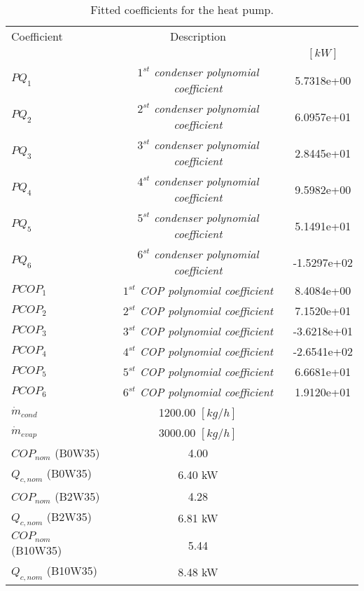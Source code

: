\documentclass[english]{SPFShortReport}
\author{Dani Carbonell}
\begin{document}
\begin{table}[!ht]
\begin{small}
\caption{Fitted coefficients for the heat pump.}
\begin{center}
\resizebox{12cm}{!} 
{
\begin{tabular}{l | c c } 
\hline
\hline
Coefficient &Description & \\ 
 & &$[kW]$\\ 
\hline
$PQ_{1}$ & \emph{$1^{st}$ condenser polynomial coefficient}  & 5.7318e+00    \\ 
$PQ_{2}$ & \emph{$2^{st}$ condenser polynomial coefficient}  & 6.0957e+01    \\ 
$PQ_{3}$ & \emph{$3^{st}$ condenser polynomial coefficient}  & 2.8445e+01    \\ 
$PQ_{4}$ & \emph{$4^{st}$ condenser polynomial coefficient}  & 9.5982e+00    \\ 
$PQ_{5}$ & \emph{$5^{st}$ condenser polynomial coefficient}  & 5.1491e+01    \\ 
$PQ_{6}$ & \emph{$6^{st}$ condenser polynomial coefficient}  & -1.5297e+02    \\ 
\hline
$PCOP_{1}$ & \emph{$1^{st}$ COP polynomial coefficient}  & 8.4084e+00    \\ 
$PCOP_{2}$ & \emph{$2^{st}$ COP polynomial coefficient}  & 7.1520e+01    \\ 
$PCOP_{3}$ & \emph{$3^{st}$ COP polynomial coefficient}  & -3.6218e+01    \\ 
$PCOP_{4}$ & \emph{$4^{st}$ COP polynomial coefficient}  & -2.6541e+02    \\ 
$PCOP_{5}$ & \emph{$5^{st}$ COP polynomial coefficient}  & 6.6681e+01    \\ 
$PCOP_{6}$ & \emph{$6^{st}$ COP polynomial coefficient}  & 1.9120e+01    \\ 
\hline
$\dot m_{cond}$ & 1200.00 $[kg/h]$\\ 
$\dot m_{evap}$ & 3000.00 $[kg/h]$\\ 
\hline
$COP_{nom}$ (B0W35)& 4.00 \\ 
$Q_{c,nom}$ (B0W35)& 6.40 kW\\ 
$COP_{nom}$ (B2W35)& 4.28 \\ 
$Q_{c,nom}$ (B2W35)& 6.81 kW\\ 
$COP_{nom}$ (B10W35)& 5.44 \\ 
$Q_{c,nom}$ (B10W35)& 8.48 kW\\ 
\hline
\hline
\end{tabular}
}
\label{CoefTable}
\end{center}
\end{small}
\end{table}
\end{document}

